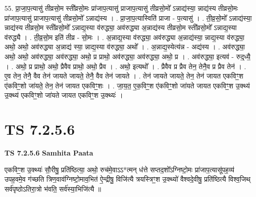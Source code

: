 \documentclass[17pt]{extarticle}
\begin{document}
55. प्रा॒जा॒प॒त्यासु॑ तीव्रसो॒म स्ती᳚व्रसो॒मः प्रा॑जाप॒त्यासु॑ प्राजाप॒त्यासु॑ तीव्रसो॒मो᳚ ऽन्नाद्य॑स्या॒ न्नाद्य॑स्य तीव्रसो॒मः प्रा॑जाप॒त्यासु॑ प्राजाप॒त्यासु॑ तीव्रसो॒मो᳚ ऽन्नाद्य॑स्य । . प्रा॒जा॒प॒त्यास्विति॑ प्राजा - प॒त्यासु॑ । . ती॒व्र॒सो॒मो᳚ ऽन्नाद्य॑स्या॒ न्नाद्य॑स्य तीव्रसो॒म स्ती᳚व्रसो॒मो᳚ ऽन्नाद्य॒स्या व॑रुद्ध्या॒ अव॑रुद्ध्या अ॒न्नाद्य॑स्य तीव्रसो॒म स्ती᳚व्रसो॒मो᳚ ऽन्नाद्य॒स्या व॑रुद्ध्यै । . ती॒व्र॒सो॒म इति॑ तीव्र - सो॒मः । . अ॒न्नाद्य॒स्या व॑रुद्ध्या॒ अव॑रुद्ध्या अ॒न्नाद्य॑स्या॒ न्नाद्य॒स्या व॑रुद्ध्या॒ अथो॒ अथो॒ अव॑रुद्ध्या अ॒न्नाद्य॑ स्या॒ न्नाद्य॒स्या व॑रुद्ध्या॒ अथो᳚ । . अ॒न्नाद्य॒स्येत्य॑न्न - अद्य॑स्य । . अव॑रुद्ध्या॒ अथो॒ अथो॒ अव॑रुद्ध्या॒ अव॑रुद्ध्या॒ अथो॒ प्र प्राथो॒ अव॑रुद्ध्या॒ अव॑रुद्ध्या॒ अथो॒ प्र । . अव॑रुद्ध्या॒ इत्यव॑ - रुद्॒ध्यै॒ । . अथो॒ प्र प्राथो॒ अथो॒ प्रैवैव प्राथो॒ अथो॒ प्रैव । . अथो॒ इत्यथो᳚ । . प्रैवैव प्र प्रैव तेन॒ तेनै॒व प्र प्रैव तेन॑ । . ए॒व तेन॒ तेनै॒ वैव तेन॑ जायते जायते॒ तेनै॒ वैव तेन॑ जायते । . तेन॑ जायते जायते॒ तेन॒ तेन॑ जायत एकविꣳ॒॒श ए॑कविꣳ॒॒शो जा॑यते॒ तेन॒ तेन॑ जायत एकविꣳ॒॒शः । . जा॒य॒त॒ ए॒क॒विꣳ॒॒श ए॑कविꣳ॒॒शो जा॑यते जायत एकविꣳ॒॒श उ॒क्थ्य॑ उ॒क्थ्य॑ एकविꣳ॒॒शो जा॑यते जायत एकविꣳ॒॒श उ॒क्थ्यः॑ । \newline
\pagebreak
{}

\section{ TS 7.2.5.6 }

\textbf{TS 7.2.5.6 } \newline
\textbf{Samhita Paata} \newline

एकविꣳ॒॒श उ॒क्थ्यः॑ सौ॒रीषु॒ प्रति॑ष्ठित्या॒ अथो॒ रुच॑मे॒वाऽऽ*त्मन् ध॑त्ते सप्तद॒शो᳚ऽग्निष्टो॒मः प्रा॑जाप॒त्यासू॑पह॒व्य॑ उपह॒वमे॒व ग॑च्छति त्रिण॒वाव॑ग्निष्टो॒माव॒भित॑ ऐ॒न्द्रीषु॒ विजि॑त्यै त्रयस्त्रिꣳ॒॒श उ॒क्थ्यो॑ वैश्वदे॒वीषु॒ प्रति॑ष्ठित्यै विश्व॒जिथ् सर्व॑पृष्ठोऽतिरा॒त्रो भ॑वति॒ सर्व॑स्या॒भिजि॑त्यै ॥ \newline
\end{document}
